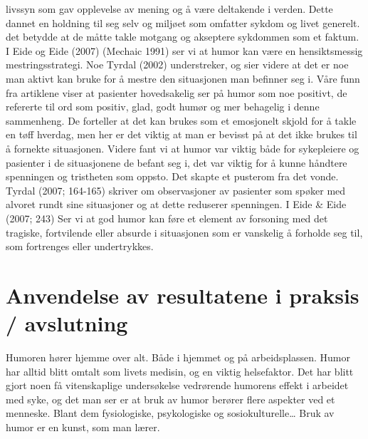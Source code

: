 livssyn som gav opplevelse av mening og å være deltakende i verden. Dette
dannet en holdning til seg selv og miljøet som omfatter sykdom og livet
generelt. det betydde at de måtte takle motgang og akseptere sykdommen som et
faktum. I Eide og Eide (2007) (Mechaic 1991) ser vi at humor kan være en
hensiktsmessig mestringsstrategi. Noe Tyrdal (2002) understreker, og sier
videre at det er noe man aktivt kan bruke for å mestre den situasjonen man
befinner seg i. Våre funn fra artiklene viser at pasienter hovedsakelig ser på
humor som noe positivt, de refererte til ord som positiv, glad, godt humør og
mer behagelig i denne sammenheng. De forteller at det kan brukes som et
emosjonelt skjold for å takle en tøff hverdag, men her er det viktig at man er
bevisst på at det ikke brukes til å fornekte situasjonen. Videre fant vi at
humor var viktig både for sykepleiere og pasienter i de situasjonene de befant
seg i, det var viktig for å kunne håndtere spenningen og tristheten som oppsto.
Det skapte et pusterom fra det vonde. Tyrdal (2007; 164-165) skriver om
observasjoner av pasienter som spøker med alvoret rundt sine situasjoner og at
dette reduserer spenningen. I Eide \&{} Eide (2007; 243) Ser vi at god humor kan
føre et element av forsoning med det tragiske, fortvilende eller absurde i
situasjonen som er vanskelig å forholde seg til, som fortrenges eller
undertrykkes. 

\chapter{Anvendelse av resultatene i praksis / avslutning}

Humoren hører hjemme over alt. Både i hjemmet og på arbeidsplassen. Humor har
alltid blitt omtalt som livets medisin, og en viktig helsefaktor. Det har blitt
gjort noen få vitenskaplige undersøkelse vedrørende humorens effekt i arbeidet
med syke, og det man ser er at bruk av humor berører flere aspekter ved et
menneske. Blant dem  fysiologiske, psykologiske og sosiokulturelle… Bruk av
humor er en kunst, som man lærer.
